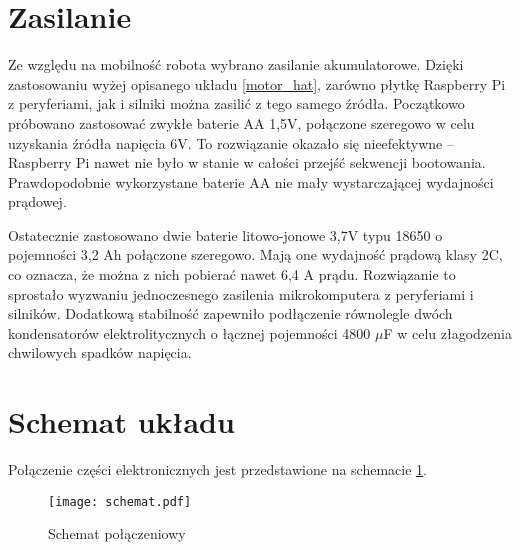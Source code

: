 \section{Zasilanie}
Ze względu na mobilność robota wybrano zasilanie akumulatorowe.
Dzięki zastosowaniu wyżej opisanego układu \ref{motor_hat}, zarówno płytkę Raspberry Pi z peryferiami, jak i silniki można zasilić z tego samego źródła.
Początkowo próbowano zastosować zwykłe baterie AA 1,5V, połączone szeregowo w celu uzyskania źródła napięcia 6V.
To rozwiązanie okazało się nieefektywne -- Raspberry Pi nawet nie było w stanie w całości przejść sekwencji bootowania.
Prawdopodobnie wykorzystane baterie AA nie mały wystarczającej wydajności prądowej.

Ostatecznie zastosowano dwie baterie litowo-jonowe 3,7V typu 18650 o pojemności 3,2 Ah połączone szeregowo.
Mają one wydajność prądową klasy 2C, co oznacza, że można z nich pobierać nawet 6,4 A prądu.
Rozwiązanie to sprostało wyzwaniu jednoczesnego zasilenia mikrokomputera z peryferiami i silników.
Dodatkową stabilność zapewniło podłączenie równolegle dwóch kondensatorów elektrolitycznych o łącznej pojemności 4800 $\mu$F w celu złagodzenia chwilowych spadków napięcia.

\section{Schemat układu}
Połączenie części elektronicznych jest przedstawione na schemacie \ref{rys:schemat}.
\begin{figure}[!hb]
    \centering \texttt{[image: schemat.pdf]}
    \caption{Schemat połączeniowy}
    \label{rys:schemat}
\end{figure}

